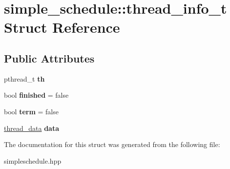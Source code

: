 \hypertarget{structsimple__schedule_1_1thread__info__t}{}\section{simple\+\_\+schedule\+:\+:thread\+\_\+info\+\_\+t Struct Reference}
\label{structsimple__schedule_1_1thread__info__t}
\subsection*{Public Attributes}
\begin{DoxyCompactItemize}
\item 
\hypertarget{structsimple__schedule_1_1thread__info__t_a3e735154c8d06ffcf57c9bff7cd57b26}{}pthread\+\_\+t {\bfseries th}\label{structsimple__schedule_1_1thread__info__t_a3e735154c8d06ffcf57c9bff7cd57b26}

\item 
\hypertarget{structsimple__schedule_1_1thread__info__t_a4356505e8a1a9acda6bfa2f90aa9f04f}{}bool {\bfseries finished} = false\label{structsimple__schedule_1_1thread__info__t_a4356505e8a1a9acda6bfa2f90aa9f04f}

\item 
\hypertarget{structsimple__schedule_1_1thread__info__t_afb3e956152bae0b26920ec322af3fa26}{}bool {\bfseries term} = false\label{structsimple__schedule_1_1thread__info__t_afb3e956152bae0b26920ec322af3fa26}

\item 
\hypertarget{structsimple__schedule_1_1thread__info__t_a63e629fbd30e78f987f48c9283863ea0}{}\hyperlink{structsimple__schedule_1_1thread__data}{thread\+\_\+data} {\bfseries data}\label{structsimple__schedule_1_1thread__info__t_a63e629fbd30e78f987f48c9283863ea0}

\end{DoxyCompactItemize}


The documentation for this struct was generated from the following file\+:\begin{DoxyCompactItemize}
\item 
simpleschedule.\+hpp\end{DoxyCompactItemize}
